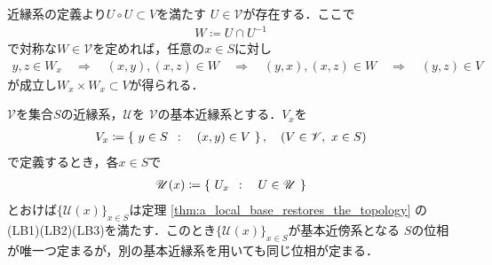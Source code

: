 	\begin{prf}
		近縁系の定義より$U \circ U \subset V$を満たす
		$U \in \mathscr{V}$が存在する．ここで
		\begin{align}
			W \coloneqq U \cap U^{-1}
		\end{align}
		で対称な$W \in \mathscr{V}$を定めれば，任意の$x \in S$に対し
		\begin{align}
			y,z \in W_x \quad \Longrightarrow \quad
			(x,y),(x,z) \in W \quad \Longrightarrow \quad
			(y,x),(x,z) \in W \quad \Longrightarrow \quad
			(y,z) \in V
		\end{align}
		が成立し$W_x \times W_x \subset V$が得られる．
		\QED
	\end{prf}
	
	\begin{screen}
		\begin{thm}[近縁系で導入する位相]\label{thm:topology_induced_by_the_uniformity}
			$\mathscr{V}$を集合$S$の近縁系，$\mathscr{U}$を
			$\mathscr{V}$の基本近縁系とする．$V_x$を
			\begin{align}
				V_x \coloneqq \left\{\ y \in S\ \, : \quad (x,y) \in V\ \right\},
				\quad (V \in \mathscr{V},\ x \in S)
			\end{align}
			で定義するとき，各$x \in S$で
			\begin{align}
				\mathscr{U}(x) \coloneqq \left\{\ U_x\ \, : \quad U \in \mathscr{U}\ \right\}
			\end{align}
			とおけば$\{\mathscr{U}(x)\}_{x \in S}$は定理
			\ref{thm:a_local_base_restores_the_topology}
			の(LB1)(LB2)(LB3)を満たす．このとき$\{\mathscr{U}(x)\}_{x \in S}$が基本近傍系となる
			$S$の位相が唯一つ定まるが，別の基本近縁系を用いても同じ位相が定まる．
		\end{thm}
	\end{screen}
	
